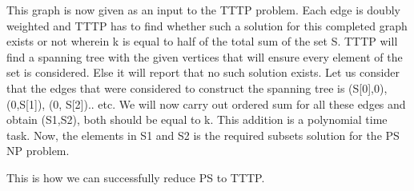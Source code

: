 \documentclass[8pt]{article}
\begin{document}
This graph is now given as an input to the TTTP problem. Each edge is doubly weighted and TTTP has to find whether such a solution for this completed graph exists or not wherein k is equal to half of the total sum of the set S. TTTP will find a spanning tree with the given vertices that will ensure every element of the set is considered. Else it will report that no such solution exists. Let us consider that the edges that were considered to construct the spanning tree is (S[0],0), (0,S[1]), (0, S[2]).. etc. We will now carry out ordered sum for all these edges and obtain (S1,S2), both should be equal to k. This addition is a polynomial time task. Now, the elements in S1 and S2 is the required subsets solution for the PS NP problem.

This is how we can successfully reduce PS to TTTP.
\end{document}
